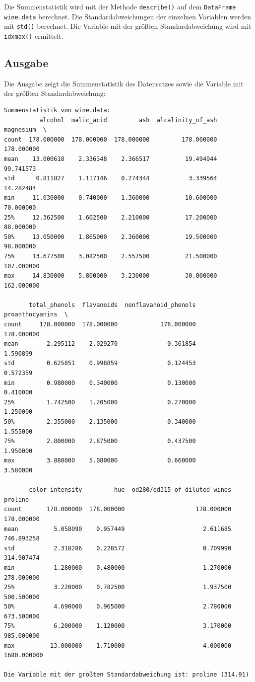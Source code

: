 Die Summenstatistik wird mit der Methode \texttt{describe()} auf dem \texttt{DataFrame} \texttt{wine.data} berechnet. Die Standardabweichungen der einzelnen Variablen werden mit \texttt{std()} berechnet. Die Variable mit der größten Standardabweichung wird mit \texttt{idxmax()} ermittelt.



\subsection{Ausgabe}

Die Ausgabe zeigt die Summenstatistik des Datensatzes sowie die Variable mit der größten Standardabweichung:

\begin{verbatim}
Summenstatistik von wine.data:
          alcohol  malic_acid         ash  alcalinity_of_ash   magnesium  \
count  178.000000  178.000000  178.000000         178.000000  178.000000   
mean    13.000618    2.336348    2.366517          19.494944   99.741573   
std      0.811827    1.117146    0.274344           3.339564   14.282484   
min     11.030000    0.740000    1.360000          10.600000   70.000000   
25%     12.362500    1.602500    2.210000          17.200000   88.000000   
50%     13.050000    1.865000    2.360000          19.500000   98.000000   
75%     13.677500    3.082500    2.557500          21.500000  107.000000   
max     14.830000    5.800000    3.230000          30.000000  162.000000   

       total_phenols  flavanoids  nonflavanoid_phenols  proanthocyanins  \
count     178.000000  178.000000            178.000000       178.000000   
mean        2.295112    2.029270              0.361854         1.590899   
std         0.625851    0.998859              0.124453         0.572359   
min         0.980000    0.340000              0.130000         0.410000   
25%         1.742500    1.205000              0.270000         1.250000   
50%         2.355000    2.135000              0.340000         1.555000   
75%         2.800000    2.875000              0.437500         1.950000   
max         3.880000    5.080000              0.660000         3.580000   

       color_intensity         hue  od280/od315_of_diluted_wines      proline  
count       178.000000  178.000000                    178.000000   178.000000  
mean          5.058090    0.957449                      2.611685   746.893258  
std           2.318286    0.228572                      0.709990   314.907474  
min           1.280000    0.480000                      1.270000   278.000000  
25%           3.220000    0.782500                      1.937500   500.500000  
50%           4.690000    0.965000                      2.780000   673.500000  
75%           6.200000    1.120000                      3.170000   985.000000  
max          13.000000    1.710000                      4.000000  1680.000000  

Die Variable mit der größten Standardabweichung ist: proline (314.91)
\end{verbatim}

